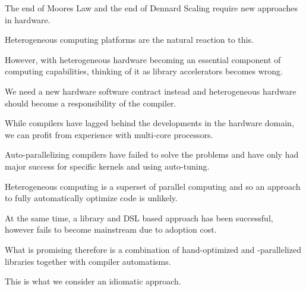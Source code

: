     The end of Moores Law and the end of Dennard Scaling require new approaches
    in hardware.

    Heterogeneous computing platforms are the natural reaction to this.

    However, with heterogeneous hardware becoming an essential component of
    computing capabilities, thinking of it as library accelerators becomes
    wrong.

    We need a new hardware software contract instead and heterogeneous hardware
    should become a responsibility of the compiler.

    While compilers have lagged behind the developments in the hardware domain,
    we can profit from experience with multi-core processors.

    Auto-parallelizing compilers have failed to solve the problems and have only
    had major success for specific kernels and using auto-tuning.

    Heterogeneous computing is a superset of parallel computing and so an
    approach to fully automatically optimize code is unlikely.

    At the same time, a library and DSL based approach has been successful,
    however fails to become mainstream due to adoption cost.

    What is promising therefore is a combination of hand-optimized and
    -parallelized libraries together with compiler automatisms.

    This is what we consider an idiomatic approach.